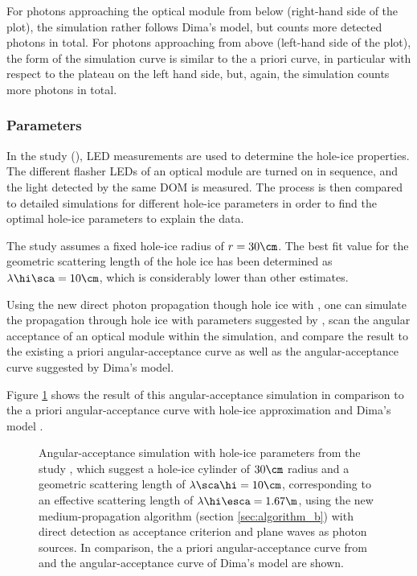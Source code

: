 For photons approaching the optical module from below (right-hand side of the plot), the simulation rather follows Dima's model, but counts more detected photons in total. For photons approaching from above (left-hand side of the plot), the form of the simulation curve is similar to the a priori curve, in particular with respect to the plateau on the left hand side, but, again, the simulation counts more photons in total.


\subsubsection{ Parameters}
\label{sec:dard_parameters}

In the  study (), LED measurements are used to determine the hole-ice properties. The different flasher LEDs of an optical module are turned on in sequence, and the light detected by the same DOM is measured. The process is then compared to detailed  simulations for different hole-ice parameters in order to find the optimal hole-ice parameters to explain the data. \cite{martindardupdate, martinspicehddard}

The  study assumes a fixed hole-ice radius of $r=30\cm$. The best fit value for the geometric scattering length of the hole ice has been determined as $\lambda\hi\sca = 10\cm$, which is considerably lower than other estimates. \cite{martindardupdate}

Using the new direct photon propagation though hole ice with \clsim, one can simulate the propagation through hole ice with parameters suggested by , scan the angular acceptance of an optical module within the simulation, and compare the result to the existing a priori angular-acceptance curve as well as the angular-acceptance curve suggested by Dima's model.


Figure \ref{fig:eePai1sh} shows the result of this angular-acceptance simulation in comparison to the a priori angular-acceptance curve with hole-ice approximation \cite{icepaper} and Dima's model \cite{flasherdataderivedicemodels}.

\begin{figure}[htbp]
  \caption{Angular-acceptance simulation with hole-ice parameters from the  study \cite{martindardupdate}, which suggest a hole-ice cylinder of $30\cm$ radius and a geometric scattering length of $\lambda\sca\hi = 10\cm$, corresponding to an effective scattering length of $\lambda\hi\esca = 1.67\m$, using the new medium-propagation algorithm (section \ref{sec:algorithm_b}) with direct detection as acceptance criterion and plane waves as photon sources. In comparison, the a priori angular-acceptance curve from \cite{icepaper} and the angular-acceptance curve of Dima's model \cite{flasherdataderivedicemodels} are shown.}
  \label{fig:eePai1sh}
\end{figure}

